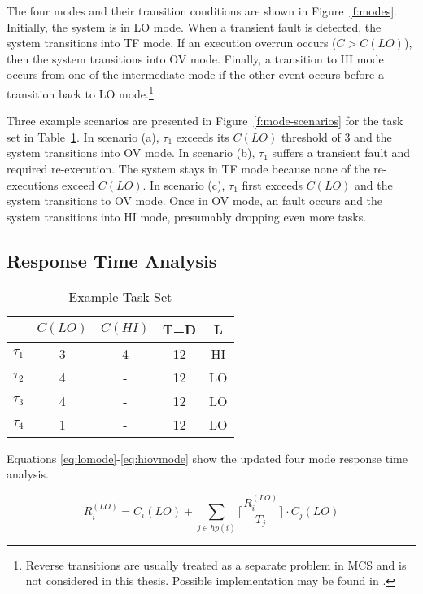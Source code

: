 	The four modes and their transition conditions are shown in Figure~\ref{f:modes}. 
	Initially, the system is in LO mode. 
	When a transient fault is detected, the system transitions into TF mode. 
	If an execution overrun occurs ($C>C(LO)$), then the system transitions into OV mode. 
	Finally, a transition to HI mode occurs from one of the intermediate mode if the other event occurs before a transition back to LO mode.\footnote{Reverse transitions are usually treated as a separate problem in MCS and is not considered in this thesis. Possible implementation may be found in \cite{bate2015bailout}.}
	
	Three example scenarios are presented in Figure~\ref{f:mode-scenarios} for the task set in Table~\ref{t:example}. 
	In scenario (a), $\tau_1$ exceeds its $C(LO)$ threshold of 3 and the system transitions into OV mode. In scenario (b), $\tau_1$ suffers a transient fault and required re-execution. The system stays in TF mode because none of the re-executions exceed $C(LO)$. In scenario (c), $\tau_1$ first exceeds $C(LO)$ and the system transitions to OV mode. Once in OV mode, an fault occurs and the system transitions into HI mode, presumably dropping even more tasks.
	

	
	
\subsection{Response Time Analysis}
	
	
	\begin{table}[t!]
\caption{Example Task Set}
\centering

	\begin{tabular}{@{}lcccc@{}}
	\toprule
	& $C(LO)$ & $C(HI)$ & T=D & L 	 \\
	\bottomrule
	$\tau_1$ & 3 & 4 & 12 & HI  \\
	$\tau_2$ & 4 & - & 12 & LO  \\
	$\tau_3$ & 4 & - & 12 & LO  \\
	$\tau_4$ & 1 & - & 12 & LO  \\
	\end{tabular}

\label{t:example}
\end{table}
	
	Equations \ref{eq:lomode}-\ref{eq:hiovmode} show the updated four mode response time analysis.
	
	
\begin{equation}
R_i^{(LO)}= C_i(LO)+\sum_{j \in hp(i)}\Big\lceil\frac{R_i^{(LO)}}{T_j}\Big\rceil \cdot C_j(LO)
\label{eq:lomode}
\end{equation}

